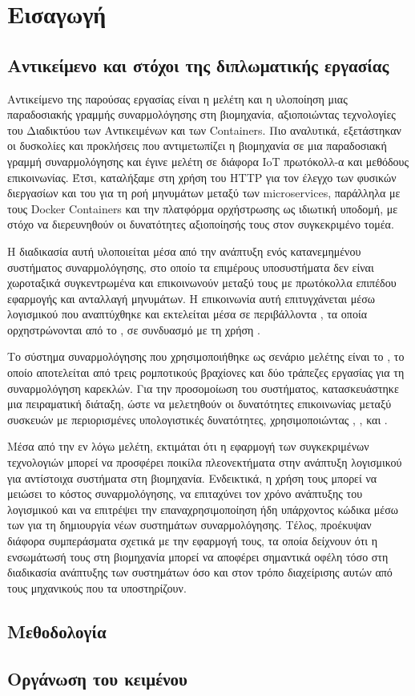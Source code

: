 
\chapter{Εισαγωγή}\label{ch:introduction}



\section{Αντικείμενο και στόχοι της διπλωματικής εργασίας}
Αντικείμενο της παρούσας εργασίας είναι η μελέτη και η υλοποίηση μιας παραδοσιακής γραμμής συναρμολόγησης στη βιομηχανία, αξιοποιώντας τεχνολογίες του Διαδικτύου των Αντικειμένων και των Containers. Πιο αναλυτικά, εξετάστηκαν οι δυσκολίες και προκλήσεις που αντιμετωπίζει η βιομηχανία σε μια παραδοσιακή γραμμή συναρμολόγησης και έγινε μελέτη σε διάφορα IoT 
πρωτόκολλ-α και μεθόδους επικοινωνίας. Έτσι, καταλήξαμε στη χρήση του HTTP για τον έλεγχο των φυσικών διεργασίων και του  για τη ροή μηνυμάτων μεταξύ των microservices, παράλληλα με τους Docker Containers και την πλατφόρμα ορχήστρωσης  ως ιδιωτική υποδομή, με στόχο να διερευνηθούν οι δυνατότητες αξιοποίησής τους στον συγκεκριμένο τομέα.

Η διαδικασία αυτή υλοποιείται μέσα από την ανάπτυξη ενός κατανεμημένου συστήματος συναρμολόγησης, στο οποίο τα επιμέρους υποσυστήματα δεν είναι χωροταξικά συγκεντρωμένα και επικοινωνούν μεταξύ τους με πρωτόκολλα επιπέδου εφαρμογής και ανταλλαγή μηνυμάτων. Η επικοινωνία αυτή επιτυγχάνεται μέσω λογισμικού που αναπτύχθηκε και εκτελείται μέσα σε περιβάλλοντα , τα οποία ορχηστρώνονται από το , σε συνδυασμό με τη χρήση .

Το σύστημα συναρμολόγησης που χρησιμοποιήθηκε ως σενάριο μελέτης είναι το  \cite{thramboulidis_cyber-physical_2018}, το οποίο αποτελείται από τρεις ρομποτικούς βραχίονες και δύο τράπεζες εργασίας για τη συναρμολόγηση καρεκλών. Για την προσομοίωση του συστήματος, κατασκευάστηκε μια πειραματική διάταξη, ώστε να μελετηθούν οι δυνατότητες επικοινωνίας μεταξύ συσκευών με περιορισμένες υπολογιστικές δυνατότητες, χρησιμοποιώντας , ,  και .

Μέσα από την εν λόγω μελέτη, εκτιμάται ότι η εφαρμογή των συγκεκριμένων τεχνολογιών μπορεί να προσφέρει ποικίλα πλεονεκτήματα στην ανάπτυξη λογισμικού για αντίστοιχα συστήματα στη βιομηχανία. Ενδεικτικά, η χρήση τους μπορεί να μειώσει το κόστος συναρμολόγησης, να επιταχύνει τον χρόνο ανάπτυξης του λογισμικού και να επιτρέψει την επαναχρησιμοποίηση ήδη υπάρχοντος κώδικα μέσω των  για τη δημιουργία νέων συστημάτων συναρμολόγησης. Τέλος, προέκυψαν διάφορα συμπεράσματα σχετικά με την εφαρμογή τους, τα οποία δείχνουν ότι η ενσωμάτωσή τους στη βιομηχανία μπορεί να αποφέρει σημαντικά οφέλη τόσο στη διαδικασία ανάπτυξης των συστημάτων όσο και στον τρόπο διαχείρισης αυτών από τους μηχανικούς που τα υποστηρίζουν.
\section{Μεθοδολογία}

\section{Οργάνωση του κειμένου}
